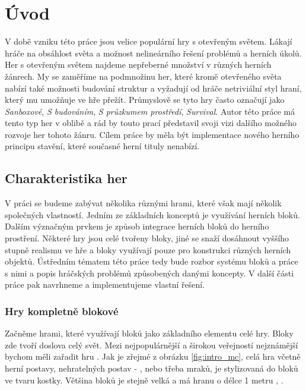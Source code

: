 
\chapter{Úvod}

V době vzniku této práce jsou velice populární hry s otevřeným světem. Lákají hráče na obsáhlost světa a možnost nelineárního řešení problémů a herních úkolů. Her s otevřeným světem najdeme nepřeberné množství v různých herních žánrech. My se zaměříme na podmnožinu her, které kromě otevřeného světa nabízí také možnosti budování struktur a vyžadují od hráče netriviální styl hraní, který mu umožňuje ve hře přežít. Průmyslově se tyto hry často označují jako \textit{Sanboxové}, \textit{S budováním}, \textit{S průzkumem prostředí}, \textit{Survival}. Autor této práce má tento typ her v oblibě a rád by touto prací představil svoji vizi dalšího možného rozvoje her tohoto žánru. Cílem práce by měla být implementace nového herního principu stavění, které současné herní tituly nenabízí.

\section{Charakteristika her}
V práci se budeme zabývat několika různými hrami, které však mají několik společných vlastností. Jedním ze základních konceptů je využívání herních bloků. Dalším význačným prvkem je způsob integrace herních bloků do herního prostření. Některé hry jsou celé tvořeny bloky, jiné se snaží dosáhnout vyššího stupně realismu ve hře a bloky využívají pouze pro konstrukci různých herních objektů. Ústředním tématem této práce tedy bude rozbor systému bloků a práce s nimi a popis hráčských problémů způsobených danými koncepty. V další části práce pak navrhneme a implementujeme vlastní řešení.




\subsection{Hry kompletně blokové}
Začněme hrami, které využívají bloků jako základního elementu celé hry. Bloky zde tvoří doslova celý svět. Mezi nejpopulárnější a širokou veřejností nejznámější bychom měli zařadit hru \MC{}. Jak je zřejmé z obrázku \ref{fig:intro_mc}, celá hra včetně herní postavy, nehratelných postav - \NPC{}, nebo třeba mraků, je stylizovaná do bloků ve tvaru kostky. Většina bloků je stejně velká a má hranu o délce 1 metru \citep{mc_block}, \citep{mc_units}. 

